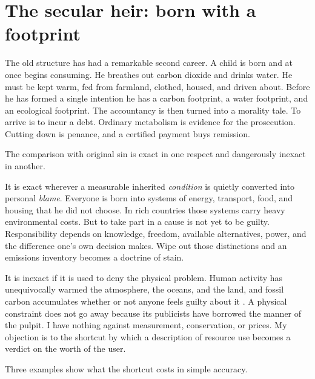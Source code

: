 \documentclass[12pt,a4paper]{book}
\begin{document}
\section{The secular heir: born with a footprint}

The old structure has had a remarkable second career. A child is born and at once begins consuming. He breathes out carbon dioxide and drinks water. He must be kept warm, fed from farmland, clothed, housed, and driven about. Before he has formed a single intention he has a carbon footprint, a water footprint, and an ecological footprint. The accountancy is then turned into a morality tale. To arrive is to incur a debt. Ordinary metabolism is evidence for the prosecution. Cutting down is penance, and a certified payment buys remission.

The comparison with original sin is exact in one respect and dangerously inexact in another.

It is exact wherever a measurable inherited \emph{condition} is quietly converted into personal \emph{blame}. Everyone is born into systems of energy, transport, food, and housing that he did not choose. In rich countries those systems carry heavy environmental costs. But to take part in a cause is not yet to be guilty. Responsibility depends on knowledge, freedom, available alternatives, power, and the difference one's own decision makes. Wipe out those distinctions and an emissions inventory becomes a doctrine of stain.

It is inexact if it is used to deny the physical problem. Human activity has unequivocally warmed the atmosphere, the oceans, and the land, and fossil carbon accumulates whether or not anyone feels guilty about it \cite{IPCC2021HumanInfluence,IPCC2023Synthesis}. A physical constraint does not go away because its publicists have borrowed the manner of the pulpit. I have nothing against measurement, conservation, or prices. My objection is to the shortcut by which a description of resource use becomes a verdict on the worth of the user.

Three examples show what the shortcut costs in simple accuracy.
\end{document}
